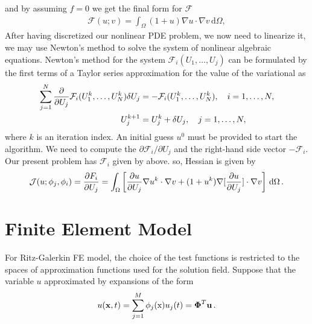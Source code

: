 \documentclass[]{article}
\begin{document}
and by assuming $f=0$ we get the final form for $\mathcal{F}$
\begin{equation}\label{eq10}
	\begin{aligned}
		\mathcal{F}(u; v) = \int_\Omega (1+u)\nabla u\cdot \nabla v \, \mathrm{d}\Omega,
	\end{aligned}
\end{equation}
After having discretized our nonlinear PDE problem, we now need to linearize it, we may use Newton’s method to solve the system of nonlinear algebraic equations. Newton’s method for the system $\mathcal{F}_i(U_1,\ldots,U_j)$ can be formulated by the first terms of a Taylor series approximation for the value of the variational as
\begin{equation}\label{eq11}
	\begin{aligned}
		\sum_{j=1}^N {\partial \over\partial U_j} \mathcal{F}_i(U_1^k,\ldots,U_N^k)\delta U_j &= -\mathcal{F}_i(U_1^k,\ldots,U_N^k),\quad i=1, \ldots ,N,\\ U_j^{k+1} &= U_j^k + \delta U_j,\quad j=1, \ldots ,N,
	\end{aligned}
\end{equation}
where $k$ is an iteration index. An initial guess $u^0$ must be provided to start the algorithm. We need to compute the $\partial \mathcal{F}_i/\partial U_j$ and the right-hand side vector $-\mathcal{F}_i$. Our present problem has $\mathcal{F}_i$ given by above. so, Hessian is given by
\begin{equation}\label{eq12}
	\begin{aligned}
		\mathcal{J}(u;\phi_j,\phi_i) = {\partial F_i\over\partial U_j} = \int_\Omega \left\lbrack \frac{\partial u}{\partial U_j} \nabla u^k \cdot \nabla v + (1+u^k) \nabla [\frac{\partial u}{\partial U_j}] \cdot \nabla v \right\rbrack \, \mathrm{d}\Omega\thinspace .
	\end{aligned}
\end{equation}
\section{Finite Element Model} \label{sec: fem}
For Ritz-Galerkin FE model, the choice of the test functions is restricted to the spaces of approximation functions used for the solution field. Suppose that the variable $u$ approximated by expansions of the form
\begin{equation}\label{eq13}
	\begin{aligned}
		u(\mathbf{x}, t)= \sum_{j=1}^{M} \phi_j(\mathrm{x}) u_j(t) = \boldsymbol{\Phi}^T\mathbf{u} \thinspace.
	\end{aligned}
\end{equation}
\end{document}
